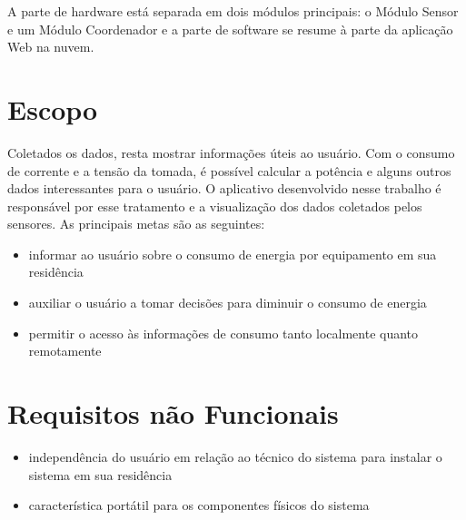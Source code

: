 A parte de hardware está separada em dois módulos principais: o Módulo Sensor e um Módulo Coordenador e a parte de software se resume à parte da aplicação Web na nuvem.



\section{Escopo}

Coletados os dados, resta mostrar informações úteis ao usuário. Com o consumo de corrente e a tensão da tomada, é possível calcular a potência e alguns outros dados interessantes para o usuário. O aplicativo desenvolvido nesse trabalho é responsável por esse tratamento e a visualização dos dados coletados pelos sensores. As principais metas são as seguintes:

\begin{itemize}
	\item{informar ao usuário sobre o consumo de energia por equipamento em sua residência}
	\item{auxiliar o usuário a tomar decisões para diminuir o consumo de energia}
  \item{permitir o acesso às informações de consumo tanto localmente quanto remotamente}
\end{itemize}

\section{Requisitos não Funcionais}

\begin{itemize}
	\item{independência do usuário em relação ao técnico do sistema para instalar o sistema em sua residência}
	\item{característica portátil para os componentes físicos do sistema}
\end{itemize}


